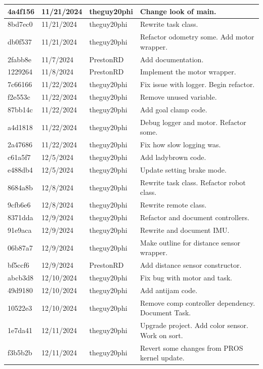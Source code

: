 \begin{center}
\begin{longtable}{|p{28pt}|p{33pt}|p{40pt}|p{300pt}|}
4a4f156 & 11/21/2024 & theguy20phi & Change look of main. \\
\hline
8bd7ec0 & 11/21/2024 & theguy20phi & Rewrite task class. \\
\hline
db0f537 & 11/21/2024 & theguy20phi & Refactor odometry some. Add motor wrapper. \\
\hline
2fabb8e & 11/7/2024 & PrestonRD & Add documentation. \\
\hline
1229264 & 11/8/2024 & PrestonRD & Implement the motor wrapper. \\
\hline
7c66166 & 11/22/2024 & theguy20phi & Fix issue with logger. Begin refactor. \\
\hline
f2e553c & 11/22/2024 & theguy20phi & Remove unused variable. \\
\hline
87bb14c & 11/22/2024 & theguy20phi & Add goal clamp code. \\
\hline
a4d1818 & 11/22/2024 & theguy20phi & Debug logger and motor. Refactor some. \\
\hline
2a47686 & 11/22/2024 & theguy20phi & Fix how slow logging was. \\
\hline
c61a5f7 & 12/5/2024 & theguy20phi & Add ladybrown code. \\
\hline
e488db4 & 12/5/2024 & theguy20phi & Update setting brake mode. \\
\hline
8684a8b & 12/8/2024 & theguy20phi & Rewrite task class. Refactor robot class. \\
\hline
9cfb6e6 & 12/8/2024 & theguy20phi & Rewrite remote class. \\
\hline
8371dda & 12/9/2024 & theguy20phi & Refactor and document controllers. \\
\hline
91e9aca & 12/9/2024 & theguy20phi & Rewrite and document IMU. \\
\hline
06b87a7 & 12/9/2024 & theguy20phi & Make outline for distance sensor wrapper. \\
\hline
bf5ccf6 & 12/9/2024 & PrestonRD & Add distance sensor constructor. \\
\hline
abcb3d8 & 12/10/2024 & theguy20phi & Fix bug with motor and task. \\
\hline
49d9180 & 12/10/2024 & theguy20phi & Add antijam code. \\
\hline
10522e3 & 12/10/2024 & theguy20phi & Remove comp controller dependency. Document Task. \\
\hline
1e7da41 & 12/11/2024 & theguy20phi & Upgrade project. Add color sensor. Work on sort. \\
\hline
f3b5b2b & 12/11/2024 & theguy20phi & Revert some changes from PROS kernel update. \\

\end{longtable}
\end{center}
